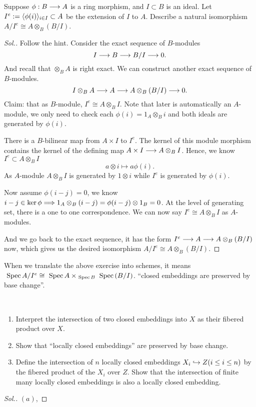 \documentclass[11pt]{book} %
\begin{document}
\begin{exr}
Suppose $\phi:B\longrightarrow A$ is a ring morphism, and $I\subset B$ is an ideal. Let $I^e:=\langle \phi(i)\rangle_{i\in I}\subset A$ be the extension of $I$ to $A$. Describe a natural isomorphism $A/I^e\cong A\otimes_{B}(B/I)$.
\end{exr}
\begin{proof}[Sol.]
Follow the hint. Consider the exact sequence of $B$-modules
$$
I\longrightarrow B\longrightarrow B/I\longrightarrow 0.
$$
And recall that $\otimes_B A$ is right exact. We can construct another exact sequence of $B$-modules.
$$
I\otimes_B A\longrightarrow A\longrightarrow A\otimes_B(B/I)\longrightarrow 0.
$$
Claim: that as $B$-module, $I^e\cong A\otimes_B I$. Note that later is automatically an $A$-module, we only need to check each $\phi(i)=1_A\otimes_B i$ and both ideals are generated by $\phi(i)$.

There is a $B$-bilinear map from $A\times I$ to $I^e$. The kernel of this module morphism contains the kernel of the defining map $A\times I\longrightarrow A\otimes_B I$. Hence, we know $I^e\subset A\otimes_B I$
$$
a\otimes i\mapsto a\phi(i).
$$
As $A$-module $A\otimes_B I$ is generated by $1\otimes i$ while $I^e$ is generated by $\phi(i)$.

Now assume $\phi(i-j)=0$, we know $i-j\in \ker \phi\Longrightarrow 1_A\otimes_B(i-j)=\phi(i-j)\otimes 1_B=0$. At the level of generating set, there is a one to one correspondence. We can now say $I^e\cong A\otimes_B I$ as $A$-modules.

And we go back to the exact sequence, it has the form $I^e\longrightarrow A\longrightarrow A\otimes_B(B/I)$ now, which gives us the desired isomorphism $A/I^e\cong A\otimes_B (B/I)$.
\end{proof}
When we translate the above exercise into schemes, it means $\text{ Spec\,} A/I^e\cong \text{ Spec\,} A\times_{\text{ Spec\,} B}\text{ Spec\,} (B/I)$. ``closed embeddings are preserved by base change''.
\begin{exr}\ 
\begin{enumerate}[label=(\alph*)]
\item Interpret the intersection of two closed embeddings into $X$ as their fibered product over $X$.
\item Show that ``locally closed embeddings'' are preserved by base change.
\item Define the intersection of $n$ locally closed embeddings $X_i\hookrightarrow Z(i\leq i\leq n)$ by the fibered product of the $X_i$ over $Z$. Show that the intersection of finite many locally closed embeddings is also a locally closed embedding.
\end{enumerate}
\end{exr}
\begin{proof}[Sol.]
$(a)$, 
\end{proof}
\end{document}
